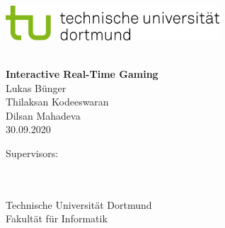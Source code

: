 \begin{titlepage}
\vspace*{-2cm}
\newlength{\links}
\setlength{\links}{-1.5cm}
\sffamily
\hspace*{\links}
\begin{minipage}{12.5cm}
\includegraphics[width=8cm]{bilder/tud_logo_rgb}
\end{minipage}

\vspace*{4cm}

\hspace*{\links}
\hspace*{-0.2cm}
\begin{minipage}{9cm}
\large
\begin{center}
{\Large \type} \\
\vspace*{1cm}
\textbf{Interactive Real-Time Gaming} \\
\vspace*{1cm}
Lukas B{\"u}nger \\ 
Thilaksan Kodeeswaran\\
Dilsan Mahadeva \\
30.09.2020 \\
\end{center}
\end{minipage}
\normalsize
\vspace*{5.5cm}


\vspace*{2.1cm}

\hspace*{\links}
\begin{minipage}[b]{8cm}
\raggedright
Supervisors: \\
\firstsupervisor \\
\secondsupervisor \\
\end{minipage}

\vspace*{2.5cm}
\hspace*{\links}
\begin{minipage}[b]{8cm}
\raggedright
Technische Universit\"at Dortmund \\
Fakult\"at f\"ur Informatik\\
\ErstLehrstuhl
\end{minipage}


\end{titlepage}

